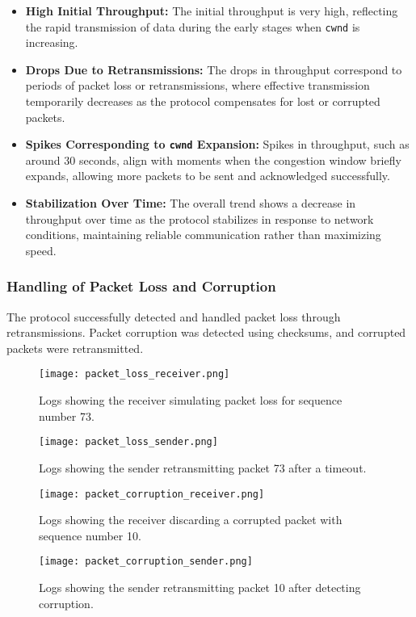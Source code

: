 \documentclass[11pt]{article}
\begin{document}
\begin{itemize}
    \item \textbf{High Initial Throughput:} The initial throughput is very high, reflecting the rapid transmission of data during the early stages when \texttt{cwnd} is increasing.
    \item \textbf{Drops Due to Retransmissions:} The drops in throughput correspond to periods of packet loss or retransmissions, where effective transmission temporarily decreases as the protocol compensates for lost or corrupted packets.
    \item \textbf{Spikes Corresponding to \texttt{cwnd} Expansion:} Spikes in throughput, such as around 30 seconds, align with moments when the congestion window briefly expands, allowing more packets to be sent and acknowledged successfully.
    \item \textbf{Stabilization Over Time:} The overall trend shows a decrease in throughput over time as the protocol stabilizes in response to network conditions, maintaining reliable communication rather than maximizing speed.
\end{itemize}

\subsubsection{Handling of Packet Loss and Corruption}

The protocol successfully detected and handled packet loss through retransmissions. Packet corruption was detected using checksums, and corrupted packets were retransmitted.

\begin{figure}[H]
    \centering
    \texttt{[image: packet\_loss\_receiver.png]}
    \caption{Logs showing the receiver simulating packet loss for sequence number 73.}
    \label{fig:packet_loss_receiver}
\end{figure}
\begin{figure}[H]
    \centering
    \texttt{[image: packet\_loss\_sender.png]}
    \caption{Logs showing the sender retransmitting packet 73 after a timeout.}
    \label{fig:packet_loss_sender}
\end{figure}

\begin{figure}[H]
    \centering
    \texttt{[image: packet\_corruption\_receiver.png]}
    \caption{Logs showing the receiver discarding a corrupted packet with sequence number 10.}
    \label{fig:packet_corruption_receiver}
\end{figure}
\begin{figure}[H]
    \centering
    \texttt{[image: packet\_corruption\_sender.png]}
    \caption{Logs showing the sender retransmitting packet 10 after detecting corruption.}
    \label{fig:packet_corruption_sender}
\end{figure}
\end{document}
